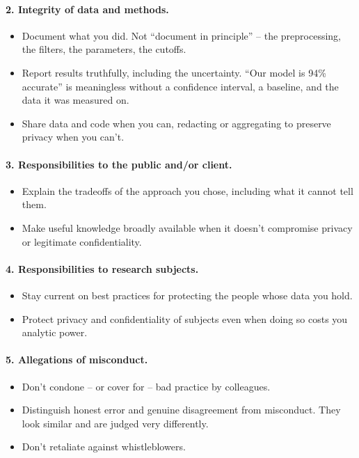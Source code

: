 \documentclass[11pt]{article}
\begin{document}
\paragraph{2. Integrity of data and methods.}
\begin{itemize}[leftmargin=*,noitemsep]
    \item Document what you did. Not ``document in principle'' -- the
          preprocessing, the filters, the parameters, the cutoffs.
    \item Report results truthfully, including the uncertainty.
          ``Our model is 94\% accurate'' is meaningless without a
          confidence interval, a baseline, and the data it was
          measured on.
    \item Share data and code when you can, redacting or aggregating
          to preserve privacy when you can't.
\end{itemize}

\paragraph{3. Responsibilities to the public and/or client.}
\begin{itemize}[leftmargin=*,noitemsep]
    \item Explain the tradeoffs of the approach you chose, including
          what it cannot tell them.
    \item Make useful knowledge broadly available when it doesn't
          compromise privacy or legitimate confidentiality.
\end{itemize}

\paragraph{4. Responsibilities to research subjects.}
\begin{itemize}[leftmargin=*,noitemsep]
    \item Stay current on best practices for protecting the people
          whose data you hold.
    \item Protect privacy and confidentiality of subjects even when
          doing so costs you analytic power.
\end{itemize}

\paragraph{5. Allegations of misconduct.}
\begin{itemize}[leftmargin=*,noitemsep]
    \item Don't condone -- or cover for -- bad practice by
          colleagues.
    \item Distinguish honest error and genuine disagreement from
          misconduct. They look similar and are judged very
          differently.
    \item Don't retaliate against whistleblowers.
\end{itemize}
\end{document}

